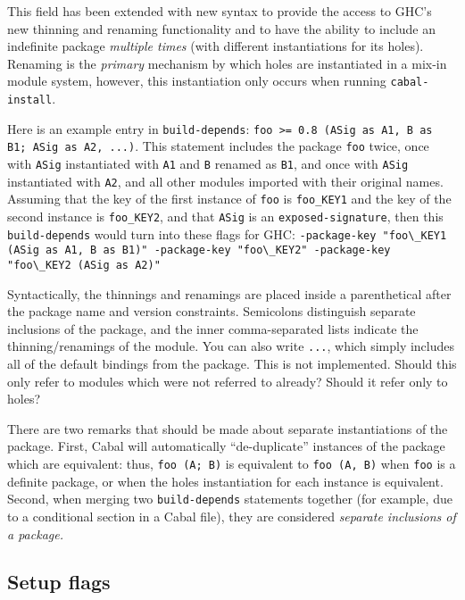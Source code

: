\documentclass{article}
\newcommand{\Red}[1]{{\color{red} #1}}
\begin{document}
This field has been extended with new syntax
to provide the access to GHC's new thinning and renaming functionality
and to have the ability to include an indefinite package \emph{multiple times}
(with different instantiations for its holes).  Renaming is the
\emph{primary} mechanism by which holes are instantiated in a mix-in module
system, however, this instantiation only occurs when running \texttt{cabal-install}.

Here is an example entry in \texttt{build-depends}:
\verb|foo >= 0.8 (ASig as A1, B as B1; ASig as A2, ...)|.  This statement includes the
package \texttt{foo} twice, once with \texttt{ASig} instantiated with
\texttt{A1} and \texttt{B} renamed as \texttt{B1}, and once with
\texttt{ASig} instantiated with \texttt{A2}, and all other modules
imported with their original names.  Assuming that the key of the first
instance of \texttt{foo} is \texttt{foo\_KEY1} and the key of the second instance
is \texttt{foo\_KEY2}, and that \texttt{ASig} is an \texttt{exposed-signature}, then this \texttt{build-depends} would turn into
these flags for GHC\@: \verb|-package-key "foo\_KEY1 (ASig as A1, B as B1)" -package-key "foo\_KEY2" -package-key "foo\_KEY2 (ASig as A2)"|

Syntactically, the thinnings and renamings are placed inside a
parenthetical after the package name and version constraints.
Semicolons distinguish separate inclusions of the package, and the inner
comma-separated lists indicate the thinning/renamings of the module.
You can also write \verb|...|, which simply
includes all of the default bindings from the package.
\Red{This is not implemented. Should this only refer to modules which were not referred to already? Should it refer only to holes?}

There are two remarks that should be made about separate instantiations of
the package.  First, Cabal will automatically ``de-duplicate'' instances of
the package which are equivalent: thus, \verb|foo (A; B)| is equivalent to
\texttt{foo (A, B)} when \texttt{foo} is a definite package, or when the
holes instantiation for each instance is equivalent.  Second, when merging
two \texttt{build-depends} statements together (for example, due to
a conditional section in a Cabal file), they are considered \emph{separate
inclusions of a package.}

\subsection{Setup flags}
\end{document}
